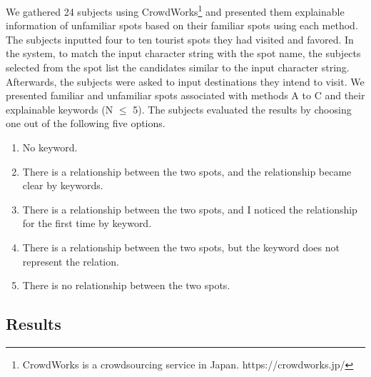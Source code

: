 \documentclass[journal]{IAENGtran}
\begin{document}
We gathered 24 subjects using CrowdWorks\footnote{CrowdWorks is a crowdsourcing service in Japan. https://crowdworks.jp/} and presented them explainable information of unfamiliar spots based on their familiar spots using each method.
The subjects inputted four to ten tourist spots they had visited and favored.
In the system, to match the input character string with the spot name, the subjects selected from the spot list the candidates similar to the input character string.
Afterwards, the subjects were asked to input destinations they intend to visit.
We presented familiar and unfamiliar spots associated with methods A to C and their explainable keywords (N $\le$ 5).
The subjects evaluated the results by choosing one out of the following five options.
\begin{enumerate}
  \item No keyword.
  \item There is a relationship between the two spots, and the relationship became clear by keywords.
  \item There is a relationship between the two spots, and I noticed the relationship for the first time by keyword.
  \item There is a relationship between the two spots, but the keyword does not represent the relation.
  \item There is no relationship between the two spots.
\end{enumerate}

\subsection{Results}
\label{subsec:Results}
\end{document}
